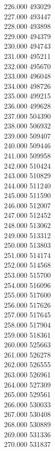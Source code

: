 { 226.000	493029 \\
 227.000	493447 \\
 228.000	493898 \\
 229.000	494379 \\
 230.000	494743 \\
 231.000	495211 \\
 232.000	495670 \\
 233.000	496048 \\
 234.000	498726 \\
 235.000	499215 \\
 236.000	499628 \\
 237.000	504390 \\
 238.000	506932 \\
 239.000	509407 \\
 240.000	509446 \\
 241.000	509958 \\
 242.000	510424 \\
 243.000	510829 \\
 244.000	511240 \\
 245.000	511590 \\
 246.000	512007 \\
 247.000	512452 \\
 248.000	513062 \\
 249.000	513312 \\
 250.000	513803 \\
 251.000	514174 \\
 252.000	514568 \\
 253.000	515700 \\
 254.000	516096 \\
 255.000	517600 \\
 256.000	517626 \\
 257.000	517645 \\
 258.000	517904 \\
 259.000	518361 \\
 260.000	525663 \\
 261.000	526278 \\
 262.000	526555 \\
 263.000	526961 \\
 264.000	527309 \\
 265.000	529561 \\
 266.000	530033 \\
 267.000	530408 \\
 268.000	530889 \\
 269.000	531336 \\
 270.000	531837 \\
}
